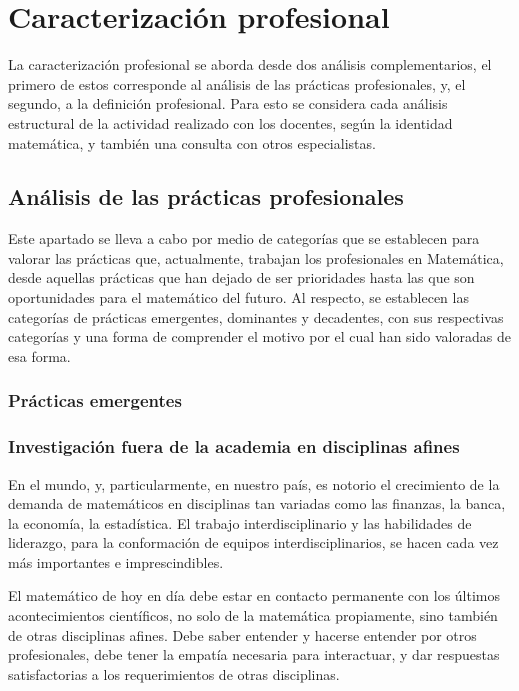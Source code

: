 



\section{Caracterización profesional}
\label{sec:CaractProf}

La caracterización profesional se aborda desde dos análisis complementarios, el primero de estos corresponde al análisis de las prácticas profesionales, y, el segundo, a la definición profesional. Para esto se considera cada análisis estructural de la actividad realizado con los docentes, según la identidad matemática, y también una consulta con otros especialistas. 


\subsection{Análisis de las prácticas profesionales}


Este apartado se lleva a cabo por medio de categorías que se establecen para valorar las prácticas que, actualmente, trabajan los profesionales en Matemática, desde aquellas prácticas que han dejado de ser prioridades hasta las que son oportunidades para el matemático del futuro. Al respecto, se establecen las categorías de prácticas emergentes, dominantes y decadentes, con sus respectivas categorías y una forma de comprender el motivo por el cual han sido valoradas de esa forma.

\subsubsection{Prácticas emergentes}

\subsubsection*{Investigación fuera de la academia en disciplinas afines}


En el mundo, y, particularmente, en nuestro país, es notorio el crecimiento de la demanda de matemáticos en disciplinas tan variadas como las finanzas, la banca, la economía, la estadística. El trabajo interdisciplinario y las habilidades de liderazgo, para la conformación de equipos interdisciplinarios, se hacen cada vez más importantes e imprescindibles. 

El matemático de hoy en día debe estar en contacto permanente con los últimos acontecimientos científicos, no solo de la matemática propiamente, sino también de otras disciplinas afines. Debe saber entender y hacerse entender por otros profesionales, debe tener la empatía necesaria para interactuar, y dar respuestas satisfactorias a los requerimientos de otras disciplinas.


